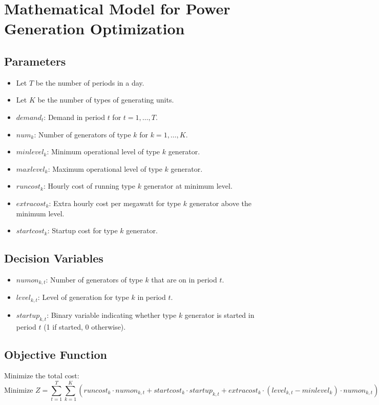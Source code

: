 \documentclass{article}
\begin{document}
\section*{Mathematical Model for Power Generation Optimization}

\subsection*{Parameters}
\begin{itemize}
    \item Let \( T \) be the number of periods in a day.
    \item Let \( K \) be the number of types of generating units.
    \item \( demand_t \): Demand in period \( t \) for \( t = 1, \ldots, T \).
    \item \( num_k \): Number of generators of type \( k \) for \( k = 1, \ldots, K \).
    \item \( minlevel_k \): Minimum operational level of type \( k \) generator.
    \item \( maxlevel_k \): Maximum operational level of type \( k \) generator.
    \item \( runcost_k \): Hourly cost of running type \( k \) generator at minimum level.
    \item \( extracost_k \): Extra hourly cost per megawatt for type \( k \) generator above the minimum level.
    \item \( startcost_k \): Startup cost for type \( k \) generator.
\end{itemize}

\subsection*{Decision Variables}
\begin{itemize}
    \item \( numon_{k,t} \): Number of generators of type \( k \) that are on in period \( t \).
    \item \( level_{k,t} \): Level of generation for type \( k \) in period \( t \).
    \item \( startup_{k,t} \): Binary variable indicating whether type \( k \) generator is started in period \( t \) (1 if started, 0 otherwise).
\end{itemize}

\subsection*{Objective Function}
Minimize the total cost:
\[
\text{Minimize } Z = \sum_{t=1}^{T} \sum_{k=1}^{K} \left( runcost_k \cdot numon_{k,t} + startcost_k \cdot startup_{k,t} + extracost_k \cdot (level_{k,t} - minlevel_k) \cdot numon_{k,t} \right)
\]
\end{document}

